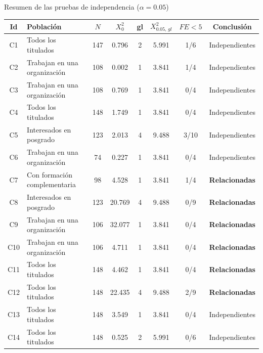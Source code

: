 \begin{mitabla}{Resumen de las pruebas de independencia ($\alpha = 0.05$)}
\begin{tabular}{clcccccc}
\toprule
Id & Población & $N$ & $X_0^2$ & gl & $X_{0.05,\,gl}^2$ & $FE<5$ & Conclusión \\
\midrule
C1 & Todos los titulados & 147 & 0.796 & 2 & 5.991 & 1/6 & Independientes \\
C2 & Trabajan en una organización & 108 & 0.002 & 1 & 3.841 & 1/4 & Independientes \\
C3 & Trabajan en una organización & 108 & 0.769 & 1 & 3.841 & 0/4 & Independientes \\
C4 & Todos los titulados & 148 & 1.749 & 1 & 3.841 & 0/4 & Independientes \\
C5 & Interesados en posgrado & 123 & 2.013 & 4 & 9.488 & 3/10 & Independientes \\
C6 & Trabajan en una organización & 74 & 0.227 & 1 & 3.841 & 0/4 & Independientes \\
C7 & Con formación complementaria & 98 & 4.528 & 1 & 3.841 & 1/4 & \textbf{Relacionadas} \\
C8 & Interesados en posgrado & 123 & 20.769 & 4 & 9.488 & 0/9 & \textbf{Relacionadas} \\
C9 & Trabajan en una organización & 106 & 32.077 & 1 & 3.841 & 0/4 & \textbf{Relacionadas} \\
C10 & Trabajan en una organización & 106 & 4.711 & 1 & 3.841 & 0/4 & \textbf{Relacionadas} \\
C11 & Todos los titulados & 148 & 4.462 & 1 & 3.841 & 0/4 & \textbf{Relacionadas} \\
C12 & Todos los titulados & 148 & 22.435 & 4 & 9.488 & 2/9 & \textbf{Relacionadas} \\
C13 & Todos los titulados & 148 & 3.549 & 1 & 3.841 & 0/4 & Independientes \\
C14 & Todos los titulados & 148 & 0.525 & 2 & 5.991 & 0/6 & Independientes \\
\bottomrule
\end{tabular}
\end{mitabla}

